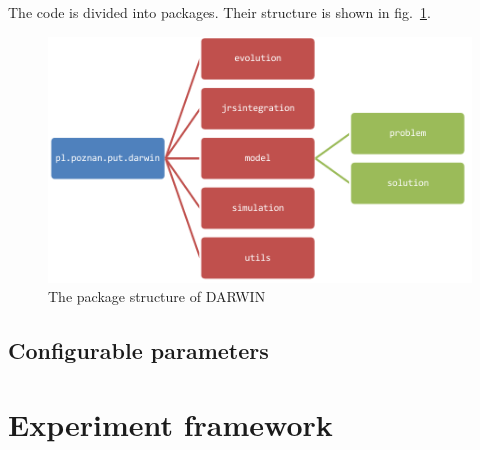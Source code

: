 The code is divided into packages. Their structure is shown in
fig.~\ref{packages}.

\begin{figure}
  \centering \includegraphics[scale=0.9]{img/packages}
  \caption{The package structure of DARWIN}
  \label{packages}
\end{figure}


\subsection{Configurable parameters}


\section{Experiment framework}
